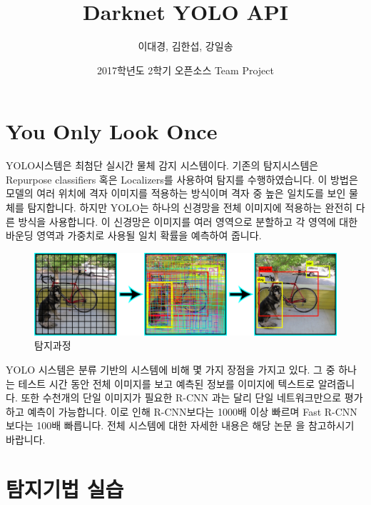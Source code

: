 \documentclass{article}
\title{Darknet YOLO API}
\author{이대경, 김한섭, 강일송 }
\date{2017학년도 2학기 오픈소스 Team Project}
\begin{document}
\maketitle

\section{You Only Look Once}

\indent YOLO시스템은 최첨단 실시간 물체 감지 시스템이다.
기존의 탐지시스템은 Repurpose classifiers 혹은 Localizers를 사용하여 탐지를 수행하였습니다. 이 방법은 모델의 여러 위치에 격자 이미지를 적용하는 방식이며 격자 중 높은 일치도를 보인 물체를 탐지합니다. 하지만 YOLO는 하나의 신경망을 전체 이미지에 적용하는 완전히 다른 방식을 사용합니다. 이 신경망은 이미지를 여러 영역으로 분할하고 각 영역에 대한 바운딩 영역과 가중치로 사용될 일치 확률을 예측하여 줍니다.

\begin{figure}[h!]
\centering
\includegraphics[scale=0.2]{model2.png}
\caption{탐지과정}
\label{fig:detect}
\end{figure}

YOLO 시스템은 분류 기반의 시스템에 비해 몇 가지 장점을 가지고 있다.
그 중 하나는 테스트 시간 동안 전체 이미지를 보고 예측된 정보를 이미지에 텍스트로 알려줍니다. 또한 수천개의 단일 이미지가 필요한 R-CNN 과는 달리 단일 네트워크만으로 평가하고 예측이 가능합니다. 이로 인해 R-CNN보다는 1000배 이상 빠르며 Fast R-CNN보다는 100배 빠릅니다. 전체 시스템에 대한 자세한 내용은 해당 논문\citep{YOLO9000} 을 참고하시기 바랍니다.


\section{탐지기법 실습}
\end{document}
